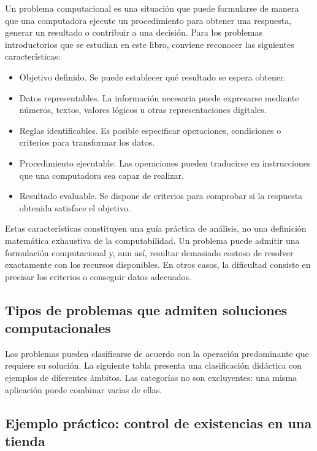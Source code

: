 Un problema computacional es una situación que puede formularse de manera que una computadora ejecute un procedimiento para obtener una respuesta, generar un resultado o contribuir a una decisión. Para los problemas introductorios que se estudian en este libro, conviene reconocer las siguientes características:

\begin{itemize}
\item Objetivo definido. Se puede establecer qué resultado se espera obtener.
\item Datos representables. La información necesaria puede expresarse mediante números, textos, valores lógicos u otras representaciones digitales.
\item Reglas identificables. Es posible especificar operaciones, condiciones o criterios para transformar los datos.
\item Procedimiento ejecutable. Las operaciones pueden traducirse en instrucciones que una computadora sea capaz de realizar.
\item Resultado evaluable. Se dispone de criterios para comprobar si la respuesta obtenida satisface el objetivo.
\end{itemize}

Estas características constituyen una guía práctica de análisis, no una definición matemática exhaustiva de la computabilidad. Un problema puede admitir una formulación computacional y, aun así, resultar demasiado costoso de resolver exactamente con los recursos disponibles. En otros casos, la dificultad consiste en precisar los criterios o conseguir datos adecuados.

\subsection{Tipos de problemas que admiten soluciones computacionales}

Los problemas pueden clasificarse de acuerdo con la operación predominante que requiere su solución. La siguiente tabla presenta una clasificación didáctica con ejemplos de diferentes ámbitos. Las categorías no son excluyentes: una misma aplicación puede combinar varias de ellas.



\subsection{Ejemplo práctico: control de existencias en una tienda}

